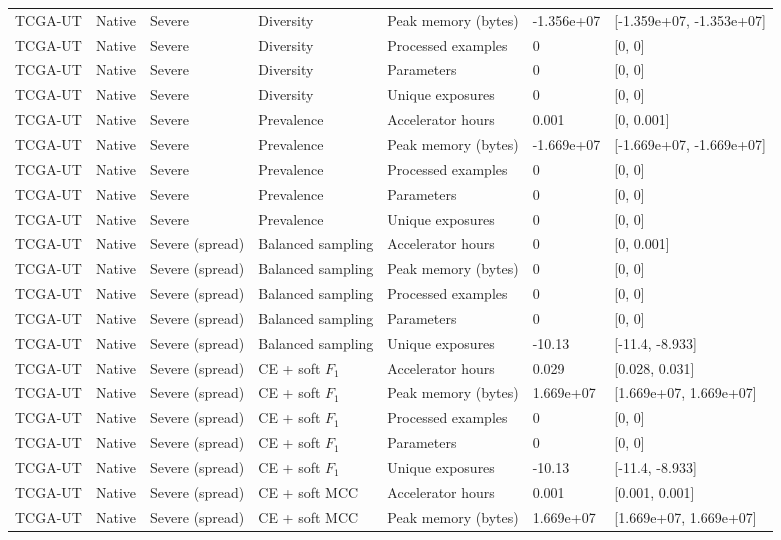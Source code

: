 \begin{longtable}{lllllll}
TCGA-UT & Native & Severe & Diversity & Peak memory (bytes) & -1.356e+07 & [-1.359e+07, -1.353e+07] \\
TCGA-UT & Native & Severe & Diversity & Processed examples & 0 & [0, 0] \\
TCGA-UT & Native & Severe & Diversity & Parameters & 0 & [0, 0] \\
TCGA-UT & Native & Severe & Diversity & Unique exposures & 0 & [0, 0] \\
TCGA-UT & Native & Severe & Prevalence & Accelerator hours & 0.001 & [0, 0.001] \\
TCGA-UT & Native & Severe & Prevalence & Peak memory (bytes) & -1.669e+07 & [-1.669e+07, -1.669e+07] \\
TCGA-UT & Native & Severe & Prevalence & Processed examples & 0 & [0, 0] \\
TCGA-UT & Native & Severe & Prevalence & Parameters & 0 & [0, 0] \\
TCGA-UT & Native & Severe & Prevalence & Unique exposures & 0 & [0, 0] \\
TCGA-UT & Native & Severe (spread) & Balanced sampling & Accelerator hours & 0 & [0, 0.001] \\
TCGA-UT & Native & Severe (spread) & Balanced sampling & Peak memory (bytes) & 0 & [0, 0] \\
TCGA-UT & Native & Severe (spread) & Balanced sampling & Processed examples & 0 & [0, 0] \\
TCGA-UT & Native & Severe (spread) & Balanced sampling & Parameters & 0 & [0, 0] \\
TCGA-UT & Native & Severe (spread) & Balanced sampling & Unique exposures & -10.13 & [-11.4, -8.933] \\
TCGA-UT & Native & Severe (spread) & CE + soft $F_1$ & Accelerator hours & 0.029 & [0.028, 0.031] \\
TCGA-UT & Native & Severe (spread) & CE + soft $F_1$ & Peak memory (bytes) & 1.669e+07 & [1.669e+07, 1.669e+07] \\
TCGA-UT & Native & Severe (spread) & CE + soft $F_1$ & Processed examples & 0 & [0, 0] \\
TCGA-UT & Native & Severe (spread) & CE + soft $F_1$ & Parameters & 0 & [0, 0] \\
TCGA-UT & Native & Severe (spread) & CE + soft $F_1$ & Unique exposures & -10.13 & [-11.4, -8.933] \\
TCGA-UT & Native & Severe (spread) & CE + soft MCC & Accelerator hours & 0.001 & [0.001, 0.001] \\
TCGA-UT & Native & Severe (spread) & CE + soft MCC & Peak memory (bytes) & 1.669e+07 & [1.669e+07, 1.669e+07] \\

\end{longtable}
